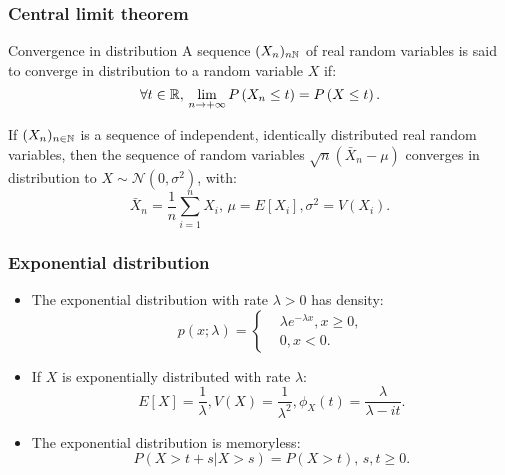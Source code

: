 \begin{frame}
    \frametitle{Central limit theorem}
\begin{block}{Convergence in distribution}
    A sequence $(X_n)_{n \mathbb{N}}$ of real random variables is said
    to converge in distribution to a random variable $X$ if:
    \begin{equation}
        \forall t \in \mathbb{R}, \, \lim_{n \to +\infty} P\left( X_n \leq t \right) = 
        P\left( X \leq t \right).
    \end{equation}
\end{block}
\begin{theorem}
   If $(X_n)_{n \in \mathbb{N}}$ is a sequence of independent, identically distributed
   real random variables, then the sequence of random variables 
   $\sqrt{n}\left( \bar{X}_n - \mu \right)$ converges in distribution to
    $X \sim \mathcal{N}(0,\sigma^2)$, with:
    \begin{equation}
        \bar{X}_n = \frac{1}{n} \sum_{i=1}^n X_i, \, \mu=E\left[ X_i \right], \sigma^2=V\left( X_i \right).
    \end{equation} 
\end{theorem}
\end{frame}
\begin{frame}
    \frametitle{Exponential distribution}
\begin{itemize}
    \item<+-> The exponential distribution with rate $\lambda > 0$ has 
    density:
    \begin{equation}
        p(x;\lambda)=
        \begin{cases}
            & \lambda e^{-\lambda x}, x \geq 0, \\
            & 0, x < 0.
        \end{cases}
    \end{equation}
    \item<+-> If $X$ is exponentially distributed with rate $\lambda:$
    \begin{equation}
             E\left[ X \right] = \frac{1}{\lambda}, V(X)=\frac{1}{\lambda^2}, 
             \phi_X(t)=\frac{\lambda}{\lambda -it}.
    \end{equation}
    \item<+-> The exponential distribution is memoryless:
    \begin{equation}
        P\left( X > t+s \vert X > s \right)=P\left( X > t \right), \, s,t \geq 0.
    \end{equation}
\end{itemize}
\end{frame}
